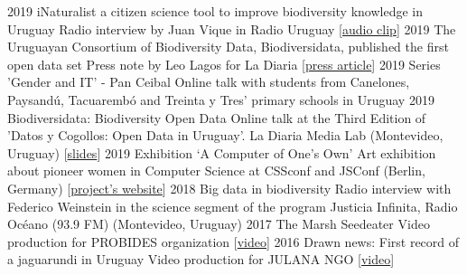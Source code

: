 \documentclass[9pt]{developercv} %
\begin{document}
\begin{entrylist}
		{2019}
		{iNaturalist a citizen science tool to improve biodiversity knowledge in Uruguay}
		{}
		{Radio interview by Juan Vique in Radio Uruguay [\href{https://sobreciencia.uy/inaturalist-una-apuesta-a-la-ciencia-ciudadana/}{audio clip}]}
	\entrylong
		{2019}
		{The Uruguayan Consortium of Biodiversity Data, Biodiversidata, published the first open data set}
		{}
		{Press note by Leo Lagos for La Diaria [\href{https://ladiaria.com.uy/ciencia/articulo/2019/7/el-consorcio-de-datos-de-biodiversidad-de-uruguay-biodiversidata-publico-el-primer-set-de-datos-abiertos/}{press article}]}
	\entrylong
		{2019}
		{Series 'Gender and IT' -  Pan Ceibal}
		{}
		{Online talk with students from Canelones, Paysandú, Tacuarembó and Treinta y Tres' primary schools in Uruguay}
	\entrylong
		{2019}
		{Biodiversidata: Biodiversity Open Data}
		{}
		{Online talk at the Third Edition of 'Datos y Cogollos: Open Data in Uruguay'. La Diaria Media Lab (Montevideo, Uruguay) [\href{https://flograttarola.com/talk/biodiversidata.-datos-abiertos-de-biodiversidad/Biodiversidata_Datos_y_Cogollos_OCT2019.pdf}{slides}]}
	\entrylong
		{2019}
		{Exhibition ‘A Computer of One’s Own’}
		{}
		{Art exhibition about pioneer women in Computer Science at CSSconf and JSConf (Berlin, Germany) [\href{https://medium.com/a-computer-of-ones-own}{project's website}]}
	\entrylong
		{2018}
		{Big data in biodiversity}
		{}
		{Radio interview with Federico Weinstein in the science segment of the program Justicia Infinita, Radio Océano (93.9 FM) (Montevideo, Uruguay)}
	\entrylong
		{2017}
		{The Marsh Seedeater}
		{}
		{Video production for PROBIDES organization [\href{https://youtu.be/EYKt83ShWQ8}{video}]}
	\entrylong
		{2016}
		{Drawn news: First record of a jaguarundi in Uruguay}
		{}
		{Video production for JULANA NGO [\href{https://youtu.be/Zva9m9hmXCc}{video}]}	
\end{entrylist}




%
%	
%	
%	
%	
%	
\end{document}
